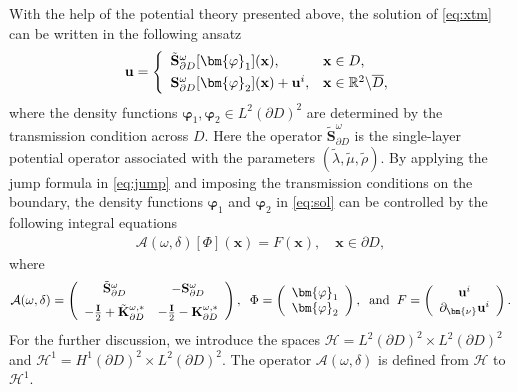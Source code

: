 \documentclass[11pt,reqno,twoside]{amsart}
\theoremstyle{definition}
\theoremstyle{remark}
\numberwithin{equation}{section}
\newcommand{\bu}{\mathbf{u}}
\newcommand{\bvarphi}{\bm{\varphi}}
\newcommand{\bnu}{\bm{\nu}}
\newcommand{\bx}{\mathbf{x}}
\newcommand{\bS}{\mathbf{S}}
\newcommand{\bK}{\mathbf{K}}
\newcommand{\bI}{\mathbf{I}}
\newcommand{\td}{\tilde}
\newcommand{\Acal}{\mathcal{A}}
\newcommand{\Hcal}{\mathcal{H}}
\begin{document}
With the help of the potential theory presented above, the solution of \eqref{eq:xtm} can be written in the following ansatz
\begin{align}\label{eq:sol}
	\bu=
	\left\{
	\begin{array}{ll}
		\td{\bS}_{\partial D}^{\omega}[\bvarphi_{1}](\bx), & \bx\in D,  \smallskip \\
		{\bS}_{\partial D}^{\omega}[\bvarphi_{2}](\bx) +\bu^i, &  \bx\in \mathbb{R}^2\backslash \overline{D},
	\end{array}
	\right.
\end{align}
where the density functions $\bvarphi_{1}, \bvarphi_{2} \in L^2(\partial D)^2$ are determined by the transmission condition across $D$. Here the operator $\td{\bS}_{\partial D}^{\omega}$ is the single-layer potential operator associated with the parameters $(\td{\lambda}, \td{\mu}, \td{\rho})$.
By applying the jump formula in \eqref{eq:jump} and imposing the transmission conditions on the boundary, the density functions $\bvarphi_{1}$ and $\bvarphi_{2}$ in \eqref{eq:sol} can be controlled by the following integral equations
\begin{align}\label{eq:or}
	\Acal(\omega,\delta) [\Phi](\bx)=F(\bx), \quad \bx\in\partial D,
\end{align}
where
\[
\Acal(\omega,\delta)=  \left(
\begin{array}{cc}
	\td{\bS}_{\partial D}^{\omega} &  -{\bS}_{\partial D}^{\omega} \medskip \\
	-\frac{\bI}{2} +  \td{\bK}_{\partial D}^{\omega, *} & -\frac{\bI}{2} -  {\bK}_{\partial D}^{\omega, *}\\
\end{array}
\right),
\;\;
\Phi= \left(
\begin{array}{c}
	\bvarphi_{1} \\
	\bvarphi_{2} \\
\end{array}
\right),
\;\; \mbox{and} \;\; 
F= \left(
\begin{array}{c}
	\bu^i \\
	\partial_{\bnu}  \bu^i \\
\end{array}
\right).
\]
For the further discussion, we introduce the spaces $\Hcal=L^2(\partial D)^2\times L^2(\partial D)^2$ and $\Hcal^1=H^1(\partial D)^2\times L^2(\partial D)^2$. The operator $\Acal(\omega,\delta)$ is defined from $\Hcal$ to $\Hcal^1$.
\end{document}
